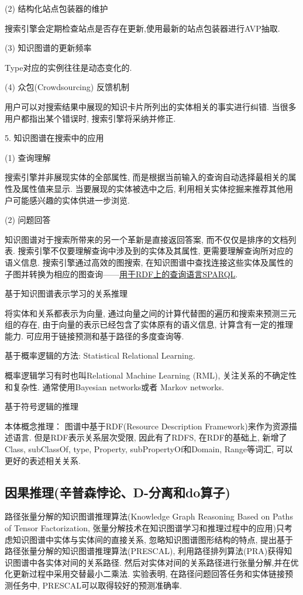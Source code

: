 (2) 结构化站点包装器的维护

搜索引擎会定期检查站点是否存在更新,使用最新的站点包装器进行AVP抽取.

(3) 知识图谱的更新频率

Type对应的实例往往是动态变化的.

(4) 众包(Crowdsourcing) 反馈机制

用户可以对搜索结果中展现的知识卡片所列出的实体相关的事实进行纠错. 当很多用户都指出某个错误时, 搜索引擎将采纳并修正.

5. 知识图谱在搜索中的应用

(1) 查询理解

搜索引擎并非展现实体的全部属性, 而是根据当前输入的查询自动选择最相关的属性及属性值来显示. 当要展现的实体被选中之后, 利用相关实体挖掘来推荐其他用户可能感兴趣的实体供进一步浏览.

(2)  问题回答

知识图谱对于搜索所带来的另一个革新是直接返回答案, 而不仅仅是排序的文档列表.
搜索引擎不仅要理解查询中涉及到的实体及其属性, 更需要理解查询所对应的语义信息.
搜索引擎通过高效的图搜索, 在知识图谱中查找连接这些实体及属性的子图并转换为相应的图查询——\href{https://www.w3.org/TR/rdf-sparql-query/}{用于RDF上的查询语言SPARQL}.

 基于知识图谱表示学习的关系推理

将实体和关系都表示为向量, 通过向量之间的计算代替图的遍历和搜索来预测三元组的存在, 由于向量的表示已经包含了实体原有的语义信息, 计算含有一定的推理能⼒. 可应用于链接预测和基于路径的多度查询等.

 基于概率逻辑的方法: Statistical Relational Learning.

概率逻辑学习有时也叫Relational Machine Learning (RML), 关注关系的不确定性和复杂性.
通常使用Bayesian networks或者 Markov networks.

 基于符号逻辑的推理

本体概念推理： 图谱中基于RDF(Resource Description Framework)来作为资源描述语言.
但是RDF表示关系层次受限, 因此有了RDFS, 在RDF的基础上, 新增了Class, subClassOf, type, Property, subPropertyOf和Domain, Range等词汇, 可以更好的表述相关关系.
\subsection{因果推理(辛普森悖论、D-分离和do算子)}

路径张量分解的知识图谱推理算法(Knowledge Graph Reasoning Based on Paths of Tensor Factorization, 张量分解技术在知识图谱学习和推理过程中的应用)只考虑知识图谱中实体与实体间的直接关系, 忽略知识图谱图形结构的特点,
提出基于路径张量分解的知识图谱推理算法(PRESCAL), 利用路径排列算法(PRA)获得知识图谱中各实体对间的关系路径.
然后对实体对间的关系路径进行张量分解,并在优化更新过程中采用交替最小二乘法.
实验表明, 在路径问题回答任务和实体链接预测任务中, PRESCAL可以取得较好的预测准确率.
